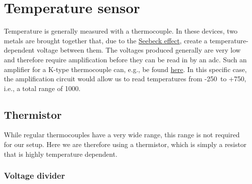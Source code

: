 
\chapter{Temperature sensor}

Temperature is generally measured with a thermocouple. In these devices, two metals are brought together that, due to the \href{https://en.wikipedia.org/wiki/Thermoelectric_effect}{Seebeck effect}, create a temperature-dependent voltage between them. The voltages produced generally are very low and therefore require amplification before they can be read in by an \ac{adc}. Such an amplifier for a K-type thermocouple can, e.g., be found \href{https://www.adafruit.com/product/1778}{here}. In this specific case, the amplification circuit would allow us to read temperatures from -250\celsius\ to +750\celsius, i.e., a total range of 1000\celsius.



\section{Thermistor}

While regular thermocouples have a very wide range, this range is not required for our setup. Here we are therefore using a thermistor, which is simply a resistor that is highly temperature dependent. 

\subsection{Voltage divider}

